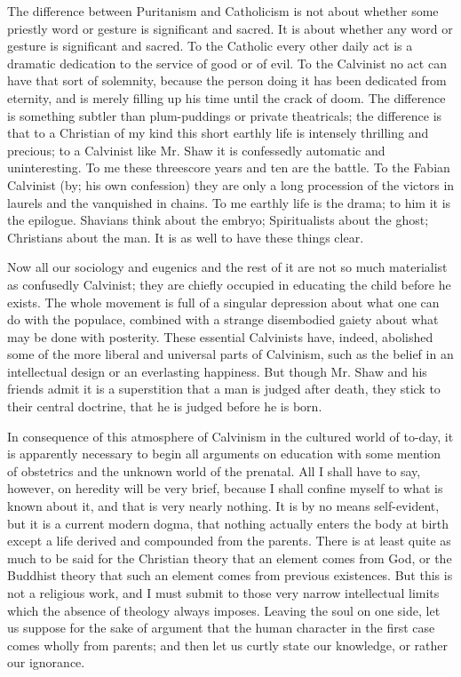\documentclass{book}
\begin{document}
The difference between Puritanism and Catholicism is not about whether some priestly word or gesture is significant and sacred. It is about whether any word or gesture is significant and sacred. To the Catholic every other daily act is a dramatic dedication to the service of good or of evil. To the Calvinist no act can have that sort of solemnity, because the person doing it has been dedicated from eternity, and is merely filling up his time until the crack of doom. The difference is something subtler than plum-puddings or private theatricals; the difference is that to a Christian of my kind this short earthly life is intensely thrilling and precious; to a Calvinist like Mr. Shaw it is confessedly automatic and uninteresting. To me these threescore years and ten are the battle. To the Fabian Calvinist (by; his own confession) they are only a long procession of the victors in laurels and the vanquished in chains. To me earthly life is the drama; to him it is the epilogue. Shavians think about the embryo; Spiritualists about the ghost; Christians about the man. It is as well to have these things clear.

Now all our sociology and eugenics and the rest of it are not so much materialist as confusedly Calvinist; they are chiefly occupied in educating the child before he exists. The whole movement is full of a singular depression about what one can do with the populace, combined with a strange disembodied gaiety about what may be done with posterity. These essential Calvinists have, indeed, abolished some of the more liberal and universal parts of Calvinism, such as the belief in an intellectual design or an everlasting happiness. But though Mr. Shaw and his friends admit it is a superstition that a man is judged after death, they stick to their central doctrine, that he is judged before he is born.

In consequence of this atmosphere of Calvinism in the cultured world of to-day, it is apparently necessary to begin all arguments on education with some mention of obstetrics and the unknown world of the prenatal. All I shall have to say, however, on heredity will be very brief, because I shall confine myself to what is known about it, and that is very nearly nothing. It is by no means self-evident, but it is a current modern dogma, that nothing actually enters the body at birth except a life derived and compounded from the parents. There is at least quite as much to be said for the Christian theory that an element comes from God, or the Buddhist theory that such an element comes from previous existences. But this is not a religious work, and I must submit to those very narrow intellectual limits which the absence of theology always imposes. Leaving the soul on one side, let us suppose for the sake of argument that the human character in the first case comes wholly from parents; and then let us curtly state our knowledge, or rather our ignorance.
\end{document}
